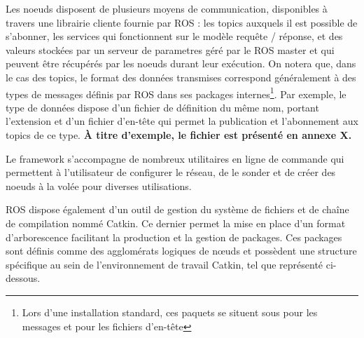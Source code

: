 Les noeuds disposent de plusieurs moyens de communication, disponibles à travers une librairie cliente fournie par \gls{ROS} : les \gls{topics}\cite{Bib_ROS_topics} auxquels il est possible de s'abonner, 
les \gls{services}\cite{Bib_ROS_services} qui fonctionnent sur le modèle requête / réponse, et des valeurs stockées par un \gls{serveur de parametres} géré par le \gls{ROS} master et qui peuvent être récupérés par les noeuds durant leur exécution.
On notera que, dans le cas des topics, le format des données transmises correspond généralement à des types de messages définis par \gls{ROS} dans ses packages 
internes\footnote{Lors d'une installation standard, ces paquets se situent sous  pour les messages et  pour les fichiers d'en-tête}. 
Par exemple, le type de données  dispose d'un fichier de définition du même nom, portant l'extension  et d'un fichier d'en-tête qui permet la publication et l'abonnement aux topics 
de ce type. \textbf{\`{A} titre d'exemple, le fichier  est présenté en annexe X.}

Le framework s'accompagne de nombreux utilitaires en ligne de commande qui permettent à l'utilisateur de configurer le réseau, de le sonder et de créer des noeuds à la volée pour diverses utilisations.

\gls{ROS} dispose également d'un outil de gestion du système de fichiers et de cha\^{i}ne de compilation nommé \gls{Catkin}.
Ce dernier permet la mise en place d'un format d'arborescence facilitant la production et la gestion de packages.
Ces packages sont définis comme des agglomérats logiques de n\oe{}uds et possèdent une structure spécifique au sein de l'environnement de travail \gls{Catkin}, tel que représenté ci-dessous. 
\\
\renewcommand*\DTstylecomment{\rmfamily\color{red}}

